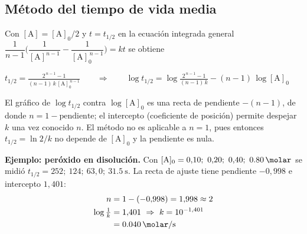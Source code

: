 \documentclass[10pt,letterpaper]{article}
\begin{document}
\clearpage
\subsection*{Método del tiempo de vida media}
Con $[\mathrm{A}]=[\mathrm{A}]_0/2$ y $t=t_{1/2}$ en la ecuación integrada general $\dfrac{1}{n-1}\Big(\dfrac{1}{[\mathrm{A}]^{n-1}}-\dfrac{1}{[\mathrm{A}]_0^{\,n-1}}\Big)=kt$ se obtiene
\begin{clave}
$\displaystyle t_{1/2}=\frac{2^{\,n-1}-1}{(n-1)\,k\,[\mathrm{A}]_0^{\,n-1}}\qquad\Longrightarrow\qquad
\log t_{1/2}=\log\frac{2^{\,n-1}-1}{(n-1)\,k}-(n-1)\,\log[\mathrm{A}]_0$
\end{clave}
El gráfico de $\log t_{1/2}$ contra $\log[\mathrm{A}]_0$ es una recta de pendiente $-(n-1)$, de donde $n=1-\text{pendiente}$; el intercepto (coeficiente de posición) permite despejar $k$ una vez conocido $n$. El método no es aplicable a $n=1$, pues entonces $t_{1/2}=\ln 2/k$ no depende de $[\mathrm{A}]_0$ y la pendiente es nula.

\vspace{4pt}
\begin{minipage}[t]{0.50\linewidth}\vspace{0pt}
\end{minipage}\hfill
\begin{minipage}[t]{0.46\linewidth}\vspace{2pt}\small\raggedright
\textbf{Ejemplo: peróxido en disolución.} Con $[\mathrm{A}]_0=0{,}10;\ 0{,}20;\ 0{,}40;\ \SI{0,80}{\molar}$ se midió $t_{1/2}=252;\ 124;\ 63{,}0;\ \SI{31,5}{\second}$. La recta de ajuste tiene pendiente $-0{,}998$ e intercepto $1{,}401$:
\begin{align*}
n&=1-(-0{,}998)=1{,}998\approx2\\
\log\tfrac{1}{k}&=1{,}401\ \Rightarrow\ k=10^{-1{,}401}\\
&=\SI{0,040}{\per\molar\per\second}
\end{align*}
\vspace{-8pt}
\end{minipage}
\end{document}

